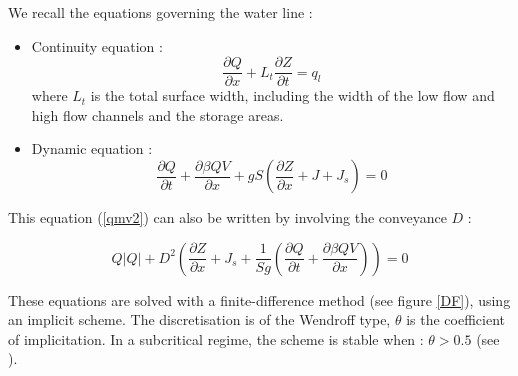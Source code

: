 We recall the equations governing the water line :
\begin{itemize}
 \item Continuity equation :
   \begin{equation}
     \frac{\partial Q}{\partial x} + L_t \frac{\partial Z}{\partial t} = q_l
   \end{equation}
   where $L_t$ is the total surface width, including the width of the low flow and high flow channels and the storage areas.
  \item Dynamic equation :
    \begin{equation}
      \label{qmv2}
      \frac{\partial Q}{\partial t} + \frac{\partial \beta Q V}{\partial x} + g S \left( \frac{\partial Z}{\partial x} + J + J_s\right) = 0
    \end{equation}
\end{itemize}

\vspace{0.5cm}

This equation (\ref{qmv2}) can also be written by involving the conveyance $D$ :

\begin{equation}
  Q |Q| + D^2 \left ( \frac{\partial Z}{\partial x} +J_s + \frac{1}{S g} \left ( \frac{\partial Q}{\partial t} + \frac{\partial \beta Q V}{\partial x}\right ) \right ) = 0
\end{equation}

\vspace{0.5cm}

These equations are solved with a finite-difference method (see figure \ref{DF}), using an implicit scheme. The discretisation is of the Wendroff type, $\theta$ is the coefficient of implicitation. In a subcritical regime, the scheme is stable when : $\theta > 0.5$ (see \cite{CUNGE64}).

